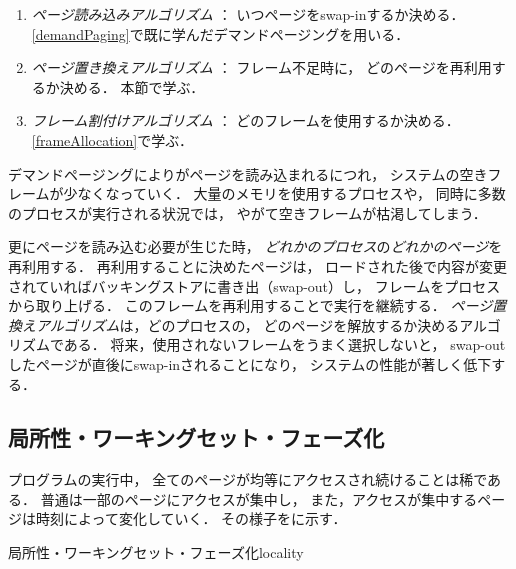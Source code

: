 \begin{enumerate}
\item \emph{ページ読み込みアルゴリズム} ： いつページをswap-inするか決める．
  \ref{demandPaging}で既に学んだデマンドページングを用いる．
\item \emph{ページ置き換えアルゴリズム} ： フレーム不足時に，
  どのページを再利用するか決める．
  本節で学ぶ．
\item \emph{フレーム割付けアルゴリズム} ： どのフレームを使用するか決める．
  \ref{frameAllocation}で学ぶ．
\end{enumerate}

デマンドページングによりがページを読み込まれるにつれ，
システムの空きフレームが少なくなっていく．
大量のメモリを使用するプロセスや，
同時に多数のプロセスが実行される状況では，
やがて空きフレームが枯渇してしまう．

更にページを読み込む必要が生じた時，
\emph{どれかのプロセス}の\emph{どれかのページ}を再利用する．
再利用することに決めたページは，
ロードされた後で内容が変更されていればバッキングストアに書き出（swap-out）し，
フレームをプロセスから取り上げる．
このフレームを再利用することで実行を継続する．
\emph{ページ置換えアルゴリズム}は，どのプロセスの，
どのページを解放するか決めるアルゴリズムである．
将来，使用されないフレームをうまく選択しないと，
swap-outしたページが直後にswap-inされることになり，
システムの性能が著しく低下する．

\subsection{局所性・ワーキングセット・フェーズ化}
プログラムの実行中，
全てのページが均等にアクセスされ続けることは稀である．
普通は一部のページにアクセスが集中し，
また，アクセスが集中するページは時刻によって変化していく．
その様子をに示す．

         {局所性・ワーキングセット・フェーズ化}{locality}

